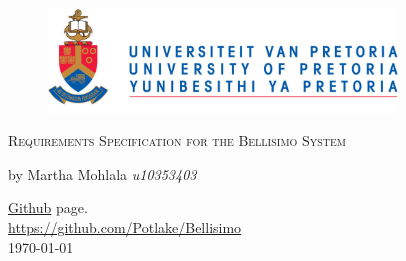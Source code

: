 \begin{titlepage}
	\begin{center}
		\begin{figure}[t]
			\centering
			\includegraphics[width=350px]{Diagrams/logo.PNG}
		\end{figure}
		
		\textsc{\LARGE Requirements Specification for the Bellisimo System}
		
		\textbf{\newline}
		\begin{flushright} \large
		\center  by\newline	
		Martha Mohlala \emph{u10353403}\newline
		\end{flushright}

		\href{https://github.com/Potlake/Bellisimo}{Github} page.\\
		\url{https://github.com/Potlake/Bellisimo}\\

{\large \today}
\end{center}
\end{titlepage}


